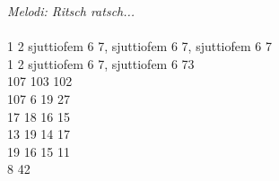{\footnotesize\textit{Melodi: Ritsch ratsch...}}\\
\\
1 2 sjuttiofem 6 7, sjuttiofem 6 7, sjuttiofem 6 7\\
1 2 sjuttiofem 6 7, sjuttiofem 6 73\\
107 103 102\\
107 6 19 27\\
17 18 16 15\\
13 19 14 17\\
19 16 15 11\\
8 42
